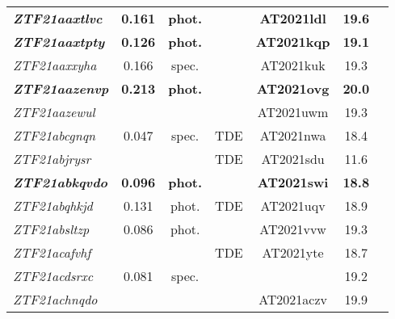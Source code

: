 \begin{table*}
\begin{tabular}{l  c  c  c   c  c  c}
    \textbf{\textit{ZTF21aaxtlvc}} & \textbf{0.161} & \textbf{phot.} & ~                       & \textbf{AT2021ldl} & \textbf{19.6 }             &                      \\
    \textbf{\textit{ZTF21aaxtpty}} & \textbf{0.126} & \textbf{phot.} & ~                       & \textbf{AT2021kqp} & \textbf{19.1}              &                      \\
    \textit{ZTF21aaxxyha}          & 0.166          & spec.          & ~                       & AT2021kuk          & 19.3                       &                      \\
    \textbf{\textit{ZTF21aazenvp}} & \textbf{0.213} & \textbf{phot.} & ~                       & \textbf{AT2021ovg} & \textbf{20.0}              &                      \\
    \textit{ZTF21aazewul}          & ~              & ~              & ~                       & AT2021uwm          & 19.3                       &                      \\
    \textit{ZTF21abcgnqn}          & 0.047          & spec.          & TDE                     & AT2021nwa          & 18.4                       &                      \\
    \textit{ZTF21abjrysr}          & ~              & ~              & TDE                     & AT2021sdu          & 11.6                       &                      \\
    \textbf{\textit{ZTF21abkqvdo}} & \textbf{0.096} & \textbf{phot.} & ~                       & \textbf{AT2021swi} & \textbf{18.8}              &                      \\
    \textit{ZTF21abqhkjd}          & 0.131          & phot.          & TDE                     & AT2021uqv          & 18.9                       &                      \\
    \textit{ZTF21absltzp}          & 0.086          & phot.          & ~                       & AT2021vvw          & 19.3                       &                      \\
    \textit{ZTF21acafvhf}          & ~              & ~              & TDE                     & AT2021yte          & 18.7                       &                      \\
    \textit{ZTF21acdsrxc}          & 0.081          & spec.          & ~                       & ~                  & 19.2                       &                      \\
    \textit{ZTF21achnqdo}          & ~              & ~              & ~                       & AT2021aczv         & 19.9                       &                      \\
  \end{tabular}
\end{table*}

